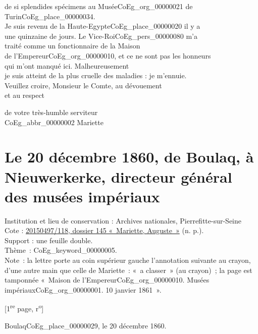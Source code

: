 \documentclass{book}
\begin{document}
{de si splendides spécimens au Musée\gls{CoEg_org_00000021} de\\
Turin\gls{CoEg_place_00000034}.\\
\indent Je suis revenu de la Haute-Egypte\gls{CoEg_place_00000020} il y a\\
une quinzaine de jours. Le Vice-Roi\gls{CoEg_pers_00000080} m’a\\
traité comme un fonctionnaire de la Maison\\
de l’Empereur\gls{CoEg_org_00000010}, et ce ne sont pas les honneurs\\
qui m’ont manqué ici. Malheureusement\\
je suis atteint de la plus cruelle des maladies :
je m’ennuie.\\
\indent Veuillez croire, Monsieur le Comte, au dévouement\\
et au respect
\begin{center}\hspace{5cm} de votre très-humble serviteur\\
\hspace{5cm} \gls{CoEg_abbr_00000002} Mariette\end{center}
\hypertarget{CoEg_Mariette_1860-12-20}{}
\section*{Le 20 décembre 1860, de Boulaq, à Nieuwerkerke, directeur général des musées impériaux}  
{\footnotesize
\noindent Institution et lieu de conservation : Archives nationales, Pierrefitte-sur-Seine\\
Cote : \hyperlink{CoEg_Mariette_ms_001}{20150497/118, dossier 145 «~Mariette, Auguste~»} (n. p.).\\
Support : une feuille double.\\
Thème~: \gls{CoEg_keyword_00000005}.\\
Note~: la lettre porte au coin supérieur gauche l’annotation suivante au crayon, d’une autre main que celle de Mariette~: «~a classer~» (au crayon)~; la page est tamponnée «~Maison de l’Empereur\gls{CoEg_org_00000010}. Musées impériaux\gls{CoEg_org_00000001}. 10 janvier 1861~».
\begin{center} {[1\textsuperscript{re} page, r\textsuperscript{o}]}\end{center}}
 
\begin{flushright}Boulaq\gls{CoEg_place_00000029}, le 20 décembre 1860.\end{flushright}

}
\end{document}

